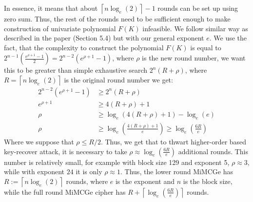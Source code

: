 \documentclass{Resources/UoBLab1}
\theoremstyle{definition}
\begin{document}
In essence, it means that about \(\left\lceil n\log_e(2) \right\rceil - 1\) rounds can be set up using zero sum. Thus, the rest of the rounds need to be sufficient enough to make construction of univariate polynomial $F(K)$ infeasible. We follow similar way as described in the paper (Section 5.4\cite{MiMCAttack}) but with our general exponent $e$. We use the fact, that the complexity to construct the polynomial $F(K)$ is equal to \(2^{n-1}(\frac{e^{\rho + 1}-1}{2}) = 2^{n-2}(e^{\rho + 1}-1)\), where $\rho$ is the new round number, we want this to be greater than simple exhaustive search \(2^n(R+\rho)\), where \(R = \left\lceil n\log_e(2) \right\rceil \) is the original round number we get:
\begin{align*}
    2^{n-2}(e^{\rho + 1}-1) &\ge 2^n(R +\rho)\\
    e^{\rho + 1} &\ge 4(R +\rho) + 1\\
    \rho &\ge \log_e(4(R+\rho) + 1) - \log_e(e)\\
    \rho &\ge \log_e\left(\frac{4(R+\rho) + 1}{e}\right) \ge \log_e\left(\frac{6R}{e}\right)
\end{align*}
Where we suppose that \(\rho \le R/2\). Thus, we get that to thwart higher-order based key-recover attack, it is necessary to take \(\rho \approx \log_e(\frac{6R}{e})\) additional rounds. This number is relatively small, for example with block size 129 and exponent 5, $\rho \approx 3$, while with exponent $24$ it is only $\rho \approx 1$. Thus, the lower round MiMCGe has \(R := \left\lceil n\log_e(2) \right\rceil\) rounds, where $e$ is the exponent and $n$ is the block size, while the full round MiMCGe cipher has \(R + \left\lceil \log_e(\frac{6R}{e}) \right\rceil\) rounds.
\end{document}
